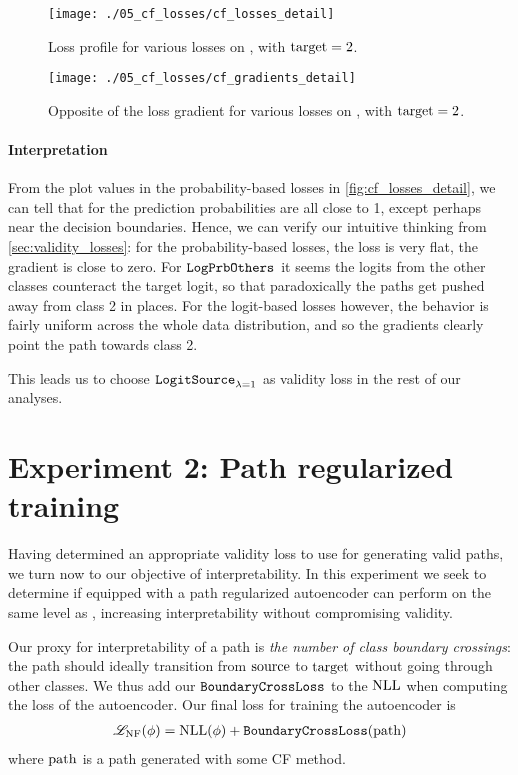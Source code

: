 \documentclass[../main.tex]{subfiles}
\begin{document}
\begin{figure}[htbp]
    \centering
\texttt{[image: ./05\_cf\_losses/cf\_losses\_detail]}
    \caption{Loss profile for various losses on \CakeOnSea, with ${\mathrm{target} = 2}$.}
    \label{fig:cf_losses_detail}

    \vspace*{\floatsep}%

\texttt{[image: ./05\_cf\_losses/cf\_gradients\_detail]}
    \caption{Opposite of the loss gradient for various losses on \CakeOnSea, with $\mathrm{target} = 2$.}
    \label{fig:cf_gradients_detail}
\end{figure}

\paragraph{Interpretation}

From the plot values in the probability-based losses in \autoref{fig:cf_losses_detail}, we can tell that for \CakeOnSea{} the prediction probabilities are all close to 1, except perhaps near the decision boundaries.
Hence, we can verify our intuitive thinking from \autoref{sec:validity_losses}: for the probability-based losses, the loss is very flat, \ie{} the gradient is close to zero.
For $\mathtt{LogPrbOthers}_{}$ it seems the logits from the other classes counteract the target logit, so that paradoxically the paths get pushed away from class 2 in places.
For the logit-based losses however, the behavior is fairly uniform across the whole data distribution, and so the gradients clearly point the path towards class 2.

This leads us to choose $\mathtt{LogitSource}_{\lambda=1}$ as validity loss in the rest of our analyses.

\section{Experiment 2: Path regularized training}
\label{exp/path_reg}

Having determined an appropriate validity loss to use for generating valid paths, we turn now to our objective of interpretability.
In this experiment we seek to determine if \ls{} equipped with a path regularized autoencoder can perform on the same level as \revise{}, increasing interpretability without compromising validity.

Our proxy for interpretability of a path is \emph{the number of class boundary crossings}:
the path should ideally transition from $\mathrm{source}$ to $\mathrm{target}$ without going through other classes.
We thus add our $\mathtt{BoundaryCrossLoss}$ to the $\text{NLL}$ when computing the loss of the autoencoder.
Our final loss for training the autoencoder is
\begin{align*}
    \mathscr{L}_\text{NF}(\phi) = \text{NLL}(\phi) + \mathtt{BoundaryCrossLoss}(\mathrm{path})
\end{align*}
where $\mathrm{path}$ is a path generated with some CF method.
\end{document}
